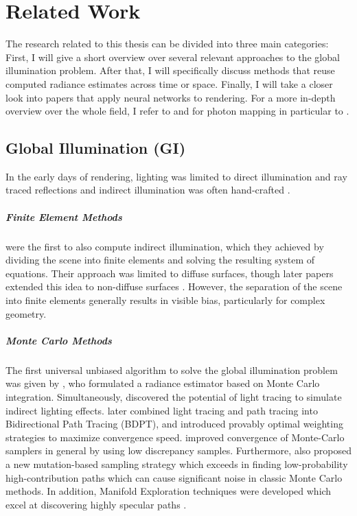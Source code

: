
\chapter{Related Work}
\label{chap:related}
The research related to this thesis can be divided into three main categories:
First, I will give a short overview over several relevant approaches to the global illumination problem.
After that, I will specifically discuss methods that reuse computed radiance estimates across time or space.
Finally, I will take a closer look into papers that apply neural networks to rendering.
For a more in-depth overview over the whole field, I refer to \textcite{ritschel2012} and for photon mapping in particular to \textcite{kang2016}.

\section{Global Illumination (GI)}
In the early days of rendering, lighting was limited to direct illumination and ray traced reflections \parencite{whitted1980} and indirect illumination was often hand-crafted \parencite{christensen2016}.

\paragraph{Finite Element Methods}
\textcite{goral1984} were the first to also compute indirect illumination, which they achieved by dividing the scene into finite elements and solving the resulting system of equations.
Their approach was limited to diffuse surfaces, though later papers extended this idea to non-diffuse surfaces \parencite{immel1986}.
However, the separation of the scene into finite elements generally results in visible bias, particularly for complex geometry.

\paragraph{Monte Carlo Methods}
The first universal unbiased algorithm to solve the global illumination problem was given by \textcite{kajiya1986}, who formulated a radiance estimator based on Monte Carlo integration.
Simultaneously, \textcite{arvo1986} discovered the potential of light tracing to simulate indirect lighting effects.
\textcite{lafortune1993} later combined light tracing and path tracing into Bidirectional Path Tracing (BDPT), and \textcite{veach1997} introduced provably optimal weighting strategies to maximize convergence speed.
\textcite{keller1995,owen1995} improved convergence of Monte-Carlo samplers in general by using low discrepancy samples.
Furthermore, \textcite{veach1997a} also proposed a new mutation-based sampling strategy which exceeds in finding low-probability high-contribution paths which can cause significant noise in classic Monte Carlo methods.
In addition, Manifold Exploration techniques were developed which excel at discovering highly specular paths \parencite{jakob2012}.


